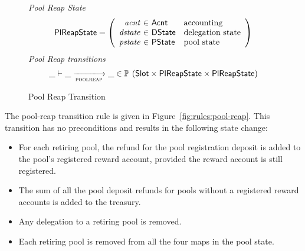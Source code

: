 \begin{figure}[htb]
  \emph{Pool Reap State}
  \begin{equation*}
    \PlReapState =
    \left(
      \begin{array}{r@{~\in~}ll}
        \var{acnt} & \Acnt & \text{accounting}\\
        \var{dstate} & \DState & \text{delegation state}\\
        \var{pstate} & \PState & \text{pool state}\\
      \end{array}
    \right)
  \end{equation*}
  \emph{Pool Reap transitions}
  \begin{equation*}
    \_ \vdash \_ \trans{poolreap}{} \_ \in
    \powerset (\Slot \times \PlReapState \times \PlReapState)
  \end{equation*}
  \caption{Pool Reap Transition}
  \label{fig:ts-types:pool-reap}
\end{figure}


The pool-reap transition rule is given in Figure~\ref{fig:rules:pool-reap}.
This transition has no preconditions and results in the following state change:

\begin{itemize}
  \item For each retiring pool, the refund for the pool registration deposit is added to the
    pool's registered reward account, provided the reward account is still registered.
  \item The sum of all the pool deposit refunds for pools without a registered reward
    accounts is added to the treasury.
  \item Any delegation to a retiring pool is removed.
  \item Each retiring pool is removed from all the four maps in the pool state.
\end{itemize}

